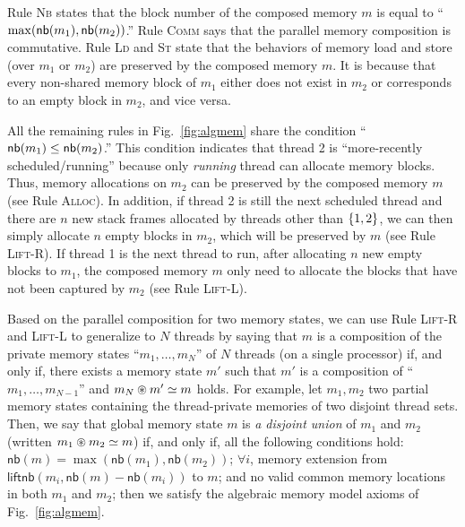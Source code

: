 Rule \textsc{Nb} states that the block number of the composed memory $m$  is equal to  ``$\max(\mathsf{nb}({m_1}), \mathsf{nb}({m_2}))$.''
Rule \textsc{Comm} says that the parallel memory composition is
commutative. Rule \textsc{Ld} and \textsc{St} state that the behaviors of memory load and store (over $m_1$ or $m_2$) are preserved by the composed memory $m$. It is because that every non-shared memory block of $m_1$ either does not exist in $m_2$ or corresponds to an empty block in $m_2$, and vice versa.


All the remaining rules  in Fig.~\ref{fig:algmem} share the condition
``$\mathsf{nb}({m_1}) \leq \mathsf{nb}({m_2})$.'' This condition indicates that thread 2 is ``more-recently scheduled/running'' because only \emph{running}
thread  can allocate memory blocks. 
Thus, memory allocations on $m_2$ can be preserved by the composed memory $m$ (see Rule \textsc{Alloc}).
In addition, if thread 2 is still the next scheduled thread and there are $n$ new stack frames allocated by threads other than $\{1,2\}$, we can then simply allocate $n$
 empty blocks in $m_2$, which will be preserved by $m$ (see Rule \textsc{Lift-R}). If thread 1 is the next thread to run, after allocating $n$ new empty blocks to $m_1$, the composed memory $m$ only need to allocate the blocks that have not been captured by $m_2$ (see Rule \textsc{Lift-L}).

Based on the parallel composition for two memory states, we can use Rule \textsc{Lift-R}  and
\textsc{Lift-L} to generalize to $N$ threads by saying that
$m$ is a composition of the private memory states ``$m_1, \dots, m_N$''
of $N$ threads (on a single processor) if, and only if, there exists a
memory state $m'$ such that $m'$ is a composition of ``$m_1, \dots,
m_{N-1}$'' and ${m_N} \circledast {m'} \simeq {m}$ holds.
For example, 
let $m_1, m_2$ two partial memory states containing the thread-private
memories of two disjoint thread sets. Then, we say that global memory
state $m$ is \emph{a disjoint union} of $m_1$ and $m_2$ (written ${m_1} \circledast {m_2} \simeq {m}$)
if, and only if, all the following conditions hold:
$\mathsf{nb}(m) = \max(\mathsf{nb}(m_1), \mathsf{nb}(m_2))$; $\forall i$,
memory extension from $\mathsf{liftnb}(m_i, \mathsf{nb}(m) - \mathsf{nb}(m_i))$ to $m$;
and no valid common memory locations in both $m_1$ and $m_2$;
then we satisfy the algebraic memory model axioms of Fig.~\ref{fig:algmem}.

